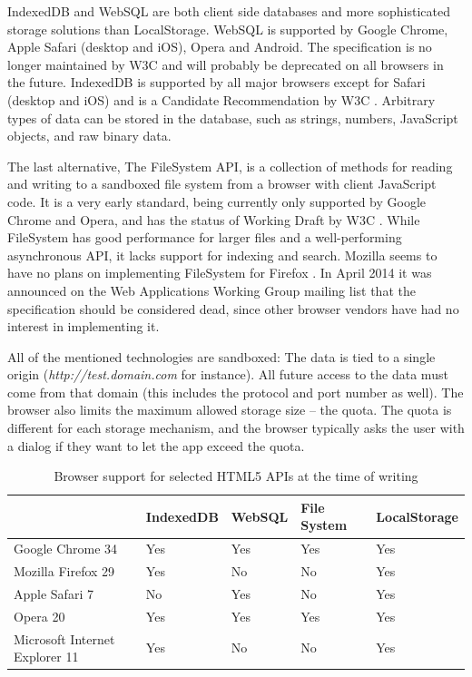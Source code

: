 IndexedDB and WebSQL are both client side databases and more sophisticated storage solutions than LocalStorage. WebSQL is supported by Google Chrome, Apple Safari (desktop and iOS), Opera and Android. The specification is no longer maintained by W3C \cite{WebSQL:Online} and will probably be deprecated on all browsers in the future. IndexedDB is supported by all major browsers except for Safari (desktop and iOS) and is a Candidate Recommendation by W3C \cite{IndexedDB:Online}. Arbitrary types of data can be stored in the database, such as strings, numbers, JavaScript objects, and raw binary data.

The last alternative, The FileSystem API, is a collection of methods for reading and writing to a sandboxed file system from a browser with client JavaScript code. It is a very early standard, being currently only supported by Google Chrome and Opera, and has the status of Working Draft by W3C \cite{FileSystem:Online}. While FileSystem has good performance for larger files and a well-performing asynchronous API, it lacks support for indexing and search. Mozilla seems to have no plans on implementing FileSystem for Firefox \cite{MozillaFileSystem:Online}. In April 2014 it was announced on the Web Applications Working Group mailing list that the specification should be considered dead, since other browser vendors have had no interest in implementing it\cite{FileSystemMailingList:Online}.

All of the mentioned technologies are sandboxed: The data is tied to a single origin (\emph{http://test.domain.com} for instance). All future access to the data must come from that domain (this includes the protocol and port number as well). The browser also limits the maximum allowed storage size – the quota. The quota is different for each storage mechanism, and the browser typically asks the user with a dialog if they want to let the app exceed the quota.

\begin{table}
    \begin{tabular}{|l|l|l|l|l|}
    \hline
                       & IndexedDB & WebSQL & File System & LocalStorage \\ \hline
    Google Chrome 34               & Yes       & Yes    & Yes  & Yes                      \\ \hline
    Mozilla Firefox 29             & Yes       & \cellcolor{red}No  & \cellcolor{red}No   & Yes                        \\ \hline
    Apple Safari 7                & \cellcolor{red}No        & Yes  & \cellcolor{red}No    & Yes                        \\ \hline
    Opera 20                       & Yes       & Yes    & Yes  & Yes                      \\ \hline
    Microsoft Internet Explorer 11 & Yes       & \cellcolor{red}No  & \cellcolor{red}No   & Yes                        \\ \hline
    \end{tabular}
    \caption {Browser support for selected HTML5 APIs at the time of writing}
\end{table}

